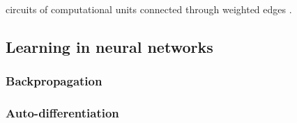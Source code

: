 \documentclass[report.tex]{subfiles}
\begin{document}
circuits of computational
units connected through weighted edges \cite{Dayan2001, Eliasmith2004}.






\subsection{Learning in neural networks}

\subsubsection{Backpropagation}

\subsubsection{Auto-differentiation}
\end{document}
